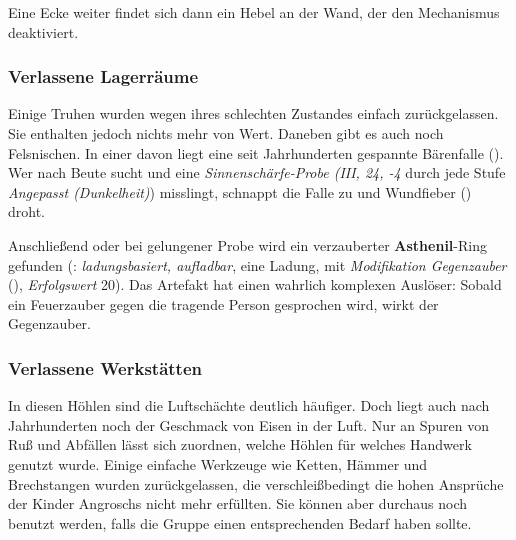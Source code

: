 \spaltenende


\spaltenanfang

Eine Ecke weiter findet sich dann ein Hebel an der Wand, der den Mechanismus deaktiviert.


\subsubsection{Verlassene Lagerräume}
Einige Truhen wurden wegen ihres schlechten Zustandes einfach zurückgelassen. 
Sie enthalten jedoch nichts mehr von Wert.
Daneben gibt es auch noch Felsnischen.
In einer davon liegt eine seit Jahrhunderten gespannte Bärenfalle ().
Wer nach Beute sucht und eine \emph{Sinnenschärfe-Probe (III, 24, -4} durch jede Stufe \emph{Angepasst (Dunkelheit)}) misslingt, schnappt die Falle zu und Wundfieber () droht.

Anschließend oder bei gelungener Probe wird ein verzauberter \textbf{Asthenil}-Ring gefunden (: \emph{ladungsbasiert, aufladbar}, eine Ladung,  mit \emph{Modifikation Gegenzauber} (), \emph{Erfolgswert} 20).
Das Artefakt hat einen wahrlich komplexen Auslöser:
Sobald ein Feuerzauber gegen die tragende Person gesprochen wird, wirkt der Gegenzauber.

\subsubsection{Verlassene Werkstätten}
In diesen Höhlen sind die Luftschächte deutlich häufiger. Doch liegt auch nach Jahrhunderten noch der Geschmack von Eisen in der Luft.
Nur an Spuren von Ruß und Abfällen lässt sich zuordnen, welche Höhlen für welches Handwerk genutzt wurde.
Einige einfache Werkzeuge wie Ketten, Hämmer und Brechstangen wurden zurückgelassen, die verschleißbedingt die hohen Ansprüche der Kinder Angroschs nicht mehr erfüllten. Sie können aber durchaus noch benutzt werden, falls die Gruppe einen entsprechenden Bedarf haben sollte.

